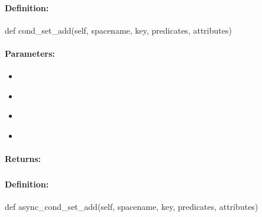 \paragraph{Definition:}
\begin{pythoncode}
def cond_set_add(self, spacename, key, predicates, attributes)
\end{pythoncode}

\paragraph{Parameters:}
\begin{itemize}[noitemsep]
\item {}\\

\item {}\\

\item {}\\

\item {}\\

\end{itemize}

\paragraph{Returns:}


\pagebreak
\subsubsection{}
\label{api:python:async_cond_set_add}


\paragraph{Definition:}
\begin{pythoncode}
def async_cond_set_add(self, spacename, key, predicates, attributes)
\end{pythoncode}

